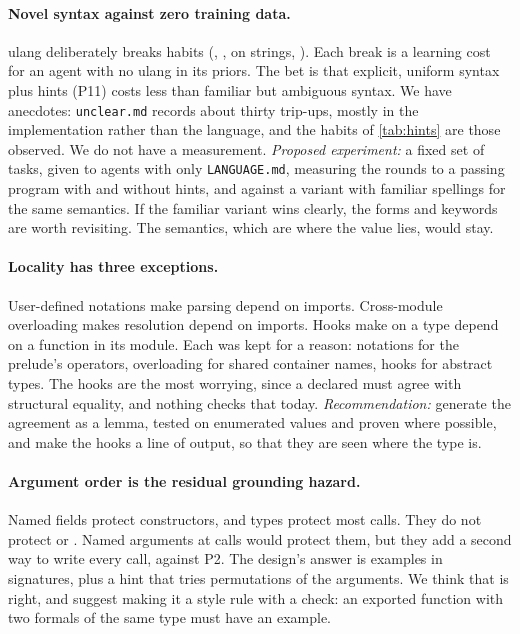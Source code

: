 \documentclass[11pt,a4paper]{article}
\newcommand{\code}[1]{\texttt{\detokenize{#1}}}
\newcommand{\file}[1]{\texttt{#1}}
\begin{document}
\paragraph{Novel syntax against zero training data.}
ulang deliberately breaks habits (\code{x := e}, \code{[1, 2]}, \code{+} on strings,
\code{return}). Each break is a learning cost for an agent with no ulang in its priors. The
bet is that explicit, uniform syntax plus hints (P11) costs less than familiar but ambiguous
syntax. We have anecdotes: \file{unclear.md} records about thirty trip-ups, mostly in the
implementation rather than the language, and the habits of \cref{tab:hints} are those
observed. We do not have a measurement. \emph{Proposed experiment:} a fixed set of tasks, given
to agents with only \file{LANGUAGE.md}, measuring the rounds to a passing program with and
without hints, and against a variant with familiar spellings for the same semantics. If the
familiar variant wins clearly, the forms and keywords are worth revisiting. The semantics,
which are where the value lies, would stay.

\paragraph{Locality has three exceptions.}
User-defined notations make parsing depend on imports. Cross-module overloading makes
resolution depend on imports. Hooks make \code{==} on a type depend on a function in its
module. Each was kept for a reason: notations for the prelude's operators, overloading for
shared container names, hooks for abstract types. The hooks are the most worrying, since a
declared \code{compare} must agree with structural equality, and nothing checks that today.
\emph{Recommendation:} generate the agreement as a lemma, tested on enumerated values and
proven where possible, and make the hooks a line of \code{sig} output, so that they are seen
where the type is.

\paragraph{Argument order is the residual grounding hazard.}
Named fields protect constructors, and types protect most calls. They do not protect
\code{slice(i, j, s)} or \code{split(sep, s)}. Named arguments at calls would protect them,
but they add a second way to write every call, against P2. The design's answer is examples
in signatures, plus a hint that tries permutations of the arguments. We think that is right,
and suggest making it a style rule with a check: an exported function with two formals of
the same type must have an example.
\end{document}
